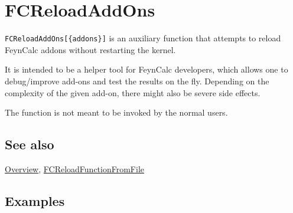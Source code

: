 \documentclass[../FeynCalcManual.tex]{subfiles}
\begin{document}
\hypertarget{fcreloadaddons}{
\section{FCReloadAddOns}\label{fcreloadaddons}}

\texttt{FCReloadAddOns[\allowbreak{}\{\allowbreak{}addons\}]} is an
auxiliary function that attempts to reload FeynCalc addons without
restarting the kernel.

It is intended to be a helper tool for FeynCalc developers, which allows
one to debug/improve add-ons and test the results on the fly. Depending
on the complexity of the given add-on, there might also be severe side
effects.

The function is not meant to be invoked by the normal users.

\subsection{See also}

\hyperlink{toc}{Overview},
\hyperlink{fcreloadfunctionfromfile}{FCReloadFunctionFromFile}

\subsection{Examples}
\end{document}
